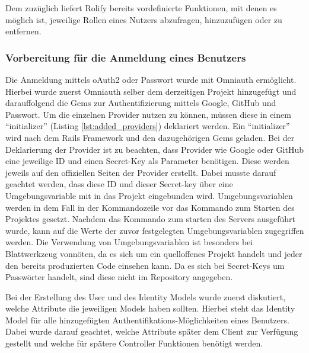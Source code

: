 Dem zuzüglich liefert Rolify bereits vordefinierte Funktionen, mit denen es möglich ist, jeweilige Rollen eines Nutzers abzufragen, hinzuzufügen oder zu entfernen.



\subsubsection{Vorbereitung für die Anmeldung eines Benutzers}
\label{sec: sign-in-imp}
Die Anmeldung mittels oAuth2 oder Passwort wurde mit Omniauth ermöglicht. Hierbei wurde zuerst Omniauth selber dem derzeitigen Projekt hinzugefügt und darauffolgend die Gems zur Authentifizierung mittels Google, GitHub und Passwort. Um die einzelnen Provider nutzen zu können, müssen diese in einem \enquote{initializer} (Listing \ref{lst:added_providers}) deklariert werden. Ein \enquote{initializer} wird nach dem Rails Framework und den dazugehörigen Gems geladen. Bei der Deklarierung der Provider ist zu beachten, dass Provider wie Google oder GitHub eine jeweilige ID und einen Secret-Key als Parameter benötigen. Diese werden jeweils auf den offiziellen Seiten der Provider erstellt. Dabei musste darauf geachtet werden, dass diese ID und dieser Secret-key über eine Umgebungsvariable mit in das Projekt eingebunden wird. Umgebungsvariablen werden in dem Fall in der Kommandozeile vor das Kommando zum Starten des Projektes gesetzt. Nachdem das Kommando zum starten des Servers ausgeführt wurde, kann auf die Werte der zuvor festgelegten Umgebungsvariablen zugegriffen werden. Die Verwendung von Umgebungsvariablen ist besonders bei Blattwerkzeug vonnöten, da es sich um ein quelloffenes Projekt handelt und jeder den bereits produzierten Code einsehen kann. Da es sich bei Secret-Keys um Passwörter handelt, sind diese nicht im Repository angegeben.

\begin{minipage}{\textwidth}
	
\end{minipage}


Bei der Erstellung des User und des Identity Models wurde zuerst diskutiert, welche Attribute die jeweiligen Models haben sollten. Hierbei steht das Identity Model für alle hinzugefügten Authentifikations-Möglichkeiten eines Benutzers. Dabei wurde darauf geachtet, welche Attribute später dem Client zur Verfügung gestellt und welche für spätere Controller Funktionen benötigt werden.

